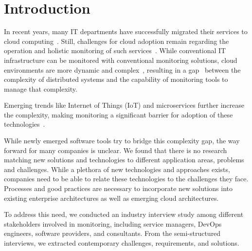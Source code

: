 \documentclass[runningheads]{llncs}
\begin{document}
\section{Introduction}

In recent years, many IT departments have successfully migrated their services to cloud computing~\cite{sfondrini2018cloudadoption}. Still, challenges for cloud adoption remain regarding the operation and holistic monitoring of such services~\cite{natu2016holistic}. While conventional IT infrastructure can be monitored with conventional monitoring solutions, cloud environments are more dynamic and complex~\cite{Aceto2013monitoringsurvey}, resulting in a gap~\cite{kinsella2015complexitygap} between the complexity of distributed systems and the capability of monitoring tools to manage that complexity. 

Emerging trends like Internet of Things (IoT) and microservices further increase the complexity, making monitoring a significant barrier for adoption of these technologies~\cite{knoche2019drivers}. 

While newly emerged software tools try to bridge this complexity gap, the way forward for many companies is unclear. We found that there is no research matching new solutions and technologies to different application areas, problems and challenges. While a plethora of new technologies and approaches exists, companies need to be able to relate these technologies to the challenges they face. Processes and good practices are necessary to incorporate new solutions into existing enterprise architectures as well as emerging cloud architectures.

To address this need, we conducted an industry interview study among different stakeholders involved in monitoring, including service managers, DevOps engineers, software providers, and consultants. From the semi-structured interviews, we extracted contemporary challenges, requirements, and solutions.


\end{document}
